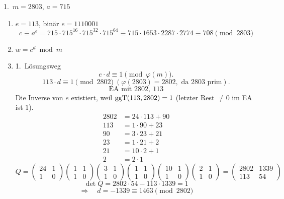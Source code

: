 \begin{loesung}
1.\ $m = 2803$, $a = 715$
\begin{enumerate}[label=\alph*)]
  \item $e = 113$, binär $e = 1110001$
  \[
  c \equiv a^e = 715 \cdot 715^{16} \cdot 715^{32} \cdot 715^{64} \equiv 715 \cdot 1653 \cdot 2287 \cdot 2774 \equiv 708 \pmod{2803}
  \]
  \item $w = c^d \bmod m$
  \item 1.\ Lösungsweg
  \[
  e \cdot d \equiv 1 \pmod{\varphi(m)}. \]\[ 113 \cdot d \equiv 1 \pmod{2802} \ (\varphi(2803) = 2802, \text{ da } 2803 \text{ prim}). \]\[ \text{EA mit } 2802,\ 113
  \]
  Die Inverse von $e$ existiert, weil $\operatorname{ggT}(113, 2802) = 1$ (letzter Rest $\neq 0$ im EA ist $1$).
  \begin{align*}
  2802 &= 24 \cdot 113 + 90\\
  113 &= 1 \cdot 90 + 23\\
  90 &= 3 \cdot 23 + 21\\
  23 &= 1 \cdot 21 + 2\\
  21 &= 10 \cdot 2 + 1\\
  2 &= 2 \cdot 1
  \end{align*}
  \[
  Q = \begin{pmatrix} 24 & 1\\ 1 & 0 \end{pmatrix}
      \begin{pmatrix} 1 & 1\\ 1 & 0 \end{pmatrix}
      \begin{pmatrix} 3 & 1\\ 1 & 0 \end{pmatrix}
      \begin{pmatrix} 1 & 1\\ 1 & 0 \end{pmatrix}
      \begin{pmatrix} 10 & 1\\ 1 & 0 \end{pmatrix}
      \begin{pmatrix} 2 & 1\\ 1 & 0 \end{pmatrix}
    = \begin{pmatrix} 2802 & 1339\\ 113 & 54 \end{pmatrix}
  \]
  \[
  \det Q = 2802 \cdot 54 - 113 \cdot 1339 = 1
  \]
  \[
  \Rightarrow\quad d = -1339 \equiv 1463 \pmod{2802}
  \]


\end{enumerate}
\end{loesung}
